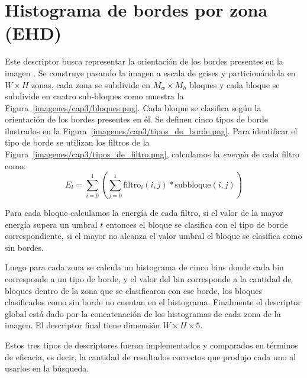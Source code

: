 \section{Histograma de bordes por zona (EHD)}
Este descriptor busca representar la orientación de los bordes presentes en la imagen \cite{Manjunath:ehd}. Se construye pasando la imagen a escala de grises y particionándola en $W \times H$ zonas, cada zona se subdivide en $M_w \times M_h$ bloques y cada bloque se subdivide en cuatro sub-bloques como muestra la Figura~\ref{imagenes/cap3/bloques.png}. 
Cada bloque se clasifica según la orientación de los bordes presentes en él. Se definen cinco tipos de borde ilustrados en la Figura~\ref{imagenes/cap3/tipos_de_borde.png}. Para identificar el tipo de borde se utilizan los filtros de la Figura~\ref{imagenes/cap3/tipos_de_filtro.png}, calculamos la \emph{energía} de cada filtro como: 
\begin{equation*}
E_i =  \displaystyle\sum_{i=0}^{1} (\displaystyle\sum_{j=0}^{1} \text{filtro}_i(i,j) * \text{subbloque}(i,j))
\end{equation*}

Para cada bloque calculamos la energía de cada filtro, si el valor de la mayor energía supera un umbral $t$ entonces el bloque se clasifica con el tipo de borde correspondiente, si el mayor no alcanza el valor umbral el bloque se clasifica como sin bordes.

Luego para cada zona se calcula un histograma de cinco bins donde cada bin corresponde a un tipo de borde, y el valor del bin corresponde a la cantidad de bloques dentro de la zona que se clasificaron con ese borde, los bloques clasificados como sin borde no cuentan en el histograma.
Finalmente el descriptor global está dado por la concatenación de los histogramas de cada zona de la imagen. El descriptor final tiene dimensión 
$W \times H \times 5$.

Estos tres tipos de descriptores fueron implementados y comparados en términos de eficacia, es decir, la cantidad de resultados correctos que produjo cada uno al usarlos en la búsqueda. 